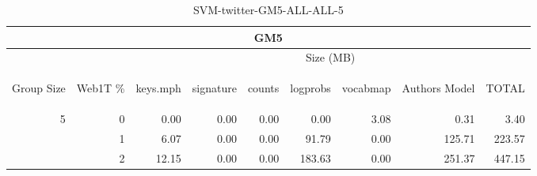 \begin{center}
\begin{table}[htbp] 
 \begin{center}
\begin{tabular}{ | r | r | r | r | r | r | r | r | r |}
\hline
\multicolumn{9}{|c|}{GM5}\\
\hline
 & & \multicolumn{7}{|c|}{Size (MB)}\\ \cline{3-9}
\begin{sideways}Group Size\end{sideways} & \begin{sideways}Web1T \% \end{sideways} & \begin{sideways}keys.mph\end{sideways} & \begin{sideways}signature\end{sideways} & \begin{sideways}counts\end{sideways} & \begin{sideways}logprobs\end{sideways} & \begin{sideways}vocabmap\end{sideways} & \begin{sideways}Authors Model \end{sideways} & \begin{sideways}TOTAL\end{sideways}\\
\hline
\multirow{2}{*}{5}
 & 0 & 0.00 & 0.00 & 0.00 & 0.00 & 3.08 & 0.31 & 3.40\\ \cline{2-9}
 & 1 & 6.07 & 0.00 & 0.00 & 91.79 & 0.00 & 125.71 & 223.57\\ \cline{2-9}
 & 2 & 12.15 & 0.00 & 0.00 & 183.63 & 0.00 & 251.37 & 447.15\\ \cline{2-9}
\hline
\end{tabular}
\caption{SVM-twitter-GM5-ALL-ALL-5}
\label{table:SVM-twitter-GM5-ALL-ALL-5}
\end{center}
 \end{table}
\end{center}

